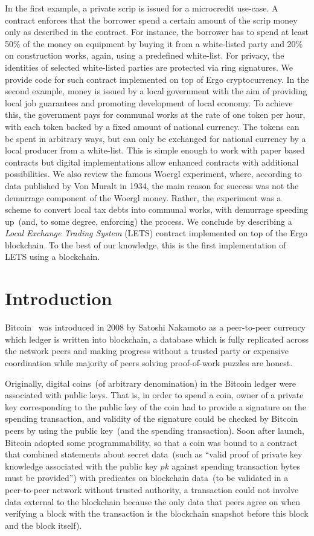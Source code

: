 \documentclass[]{llncs}   %
\begin{document}
In the first example, a private scrip is issued for a microcredit use-case. A contract enforces that the borrower spend a certain amount of the scrip money only as described in the contract. For instance, the borrower has to spend at least 50\% of the money on equipment by buying it from a white-listed party and 20\% on construction works, again, using a predefined white-list. For privacy, the identities of selected white-listed parties are protected via ring signatures. We provide code for such contract implemented on top of Ergo cryptocurrency. In the second example, money is issued by a local government with the aim of providing local job guarantees and promoting development of local economy. To achieve this, the government pays for communal works at the rate of one token per hour, with each token backed by a fixed amount of national currency. The tokens can be spent in arbitrary ways, but can only be exchanged for national currency by a local producer from a white-list. This is simple enough to work with paper based contracts but digital implementations allow enhanced contracts with additional possibilities. We also review the famous Woergl experiment, where, according to data published by Von Muralt in 1934, the main reason for success was not the demurrage component of the Woergl money. Rather, the experiment was a scheme to convert local tax debts into communal works, with demurrage speeding up~(and, to some degree, enforcing) the process. We conclude by describing a {\em Local Exchange Trading System} (LETS) contract implemented on top of the Ergo blockchain. To the best of our knowledge, this is the first implementation of LETS using a blockchain.


\section{Introduction}
\label{sec-intro}
 
Bitcoin~\cite{Nakamoto2008} was introduced in 2008 by Satoshi Nakamoto as a peer-to-peer currency which ledger is
written into blockchain, a database which is fully replicated across the network peers and making progress without a trusted
party or expensive coordination while majority of peers solving proof-of-work puzzles are honest.

Originally, digital coins~(of arbitrary denomination) in the Bitcoin ledger were associated with public keys. That is, in order
to spend a coin, owner of a private key corresponding to the public key of the coin had to provide a signature on the 
spending transaction, and validity of the signature could be checked by Bitcoin peers by using the public key~(and the spending transaction).
Soon after launch, Bitcoin adopted some programmability, so that a coin was bound to a contract that combined
statements about secret data~(such as ``valid proof of private key knowledge associated with the public key $pk$
against spending transaction bytes must be provided'') with predicates on blockchain
data~(to be validated in a peer-to-peer network without trusted authority, a transaction could not involve
data external to the blockchain because the only data that peers agree on when verifying a block with the transaction
is the blockchain snapshot before this block and the block itself).
\end{document}
